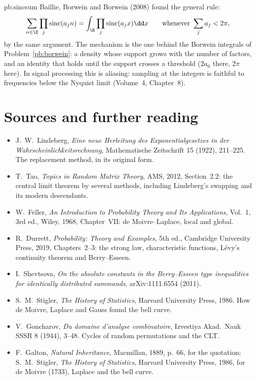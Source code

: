 \begin{solution}{pb:sincsum}
\leads Baillie, Borwein and Borwein (2008) found the general rule:
\[
\sum_{n\in\Z}\prod_j\operatorname{sinc}(a_jn)=\int_{\R}\prod_j\operatorname{sinc}(a_jx)\dd x\qquad\text{whenever }\sum_ja_j<2\pi,
\]
by the same argument. The mechanism is the one behind the Borwein integrals of Problem~\ref{pb:borwein}: a density whose support grows with
the number of factors, and an identity that holds until the support crosses a threshold ($2a_0$ there, $2\pi$ here). In signal processing this is aliasing: sampling at the integers is faithful to frequencies below the
Nyquist limit (Volume~4, Chapter~8).
\end{solution}

\section*{Sources and further reading}

\begin{itemize}
\item J.~W.~Lindeberg, \emph{Eine neue Herleitung des Exponentialgesetzes in der Wahrscheinlichkeitsrechnung},
Mathematische Zeitschrift 15 (1922), 211--225. The replacement method, in its original form.
\item T.~Tao, \emph{Topics in Random Matrix Theory}, AMS, 2012, Section~2.2: the central limit theorem by several
methods, including Lindeberg's swapping and its modern descendants.
\item W.~Feller, \emph{An Introduction to Probability Theory and Its Applications}, Vol.~1, 3rd ed., Wiley, 1968,
Chapter~VII: de Moivre--Laplace, local and global.
\item R.~Durrett, \emph{Probability: Theory and Examples}, 5th ed., Cambridge University Press, 2019, Chapters~2--3:
the strong law, characteristic functions, Lévy's continuity theorem and Berry--Esseen.
\item I.~Shevtsova, \emph{On the absolute constants in the Berry--Esseen type inequalities for identically distributed
summands}, arXiv:1111.6554 (2011).
\item S.~M.~Stigler, \emph{The History of Statistics}, Harvard University Press, 1986. How de Moivre, Laplace and Gauss
found the bell curve.
\item V.~Goncharov, \emph{Du domaine d'analyse combinatoire}, Izvestiya Akad.\ Nauk SSSR 8 (1944), 3--48. Cycles of random
permutations and the CLT.
\item F.~Galton, \emph{Natural Inheritance}, Macmillan, 1889, p.~66, for the quotation; S.~M.~Stigler, \emph{The History of Statistics}, Harvard University Press, 1986, for de Moivre (1733), Laplace and the bell curve.
\end{itemize}
